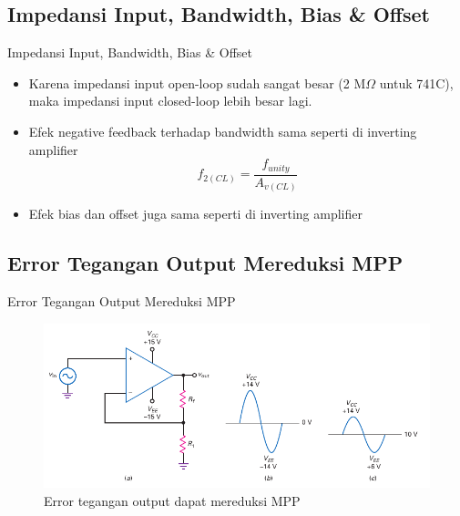 \subsection{Impedansi Input, Bandwidth, Bias \& Offset}
\begin{frame}{Impedansi Input, Bandwidth, Bias \& Offset}
	\begin{itemize}
		\item Karena impedansi input open-loop sudah sangat besar (2 M$ \Omega $ untuk 741C), maka impedansi input closed-loop lebih besar lagi.
		\item Efek negative feedback terhadap bandwidth sama seperti di inverting amplifier
		\[ f_{2(CL)} = \frac{f_{unity}}{A_{v(CL)}} \]
		\item Efek bias dan offset juga sama seperti di inverting amplifier
	\end{itemize}
\end{frame}

\subsection{Error Tegangan Output Mereduksi MPP}
\begin{frame}{Error Tegangan Output Mereduksi MPP}
	\begin{figure}
		\centering
		\includegraphics[width=0.9\linewidth]{gambar/fig-16.21}
		\caption{Error tegangan output dapat mereduksi MPP}
		\label{fig-16.21}
	\end{figure}
\end{frame}

